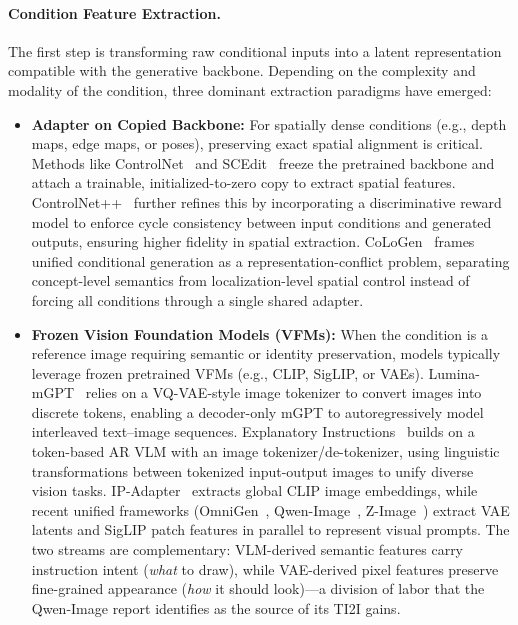 \paragraph{Condition Feature Extraction.}
The first step is transforming raw conditional inputs into a latent representation compatible with the generative backbone. Depending on the complexity and modality of the condition, three dominant extraction paradigms have emerged:
\begin{itemize}
    \item \textbf{Adapter on Copied Backbone:} For spatially dense conditions (e.g., depth maps, edge maps, or poses), preserving exact spatial alignment is critical. Methods like ControlNet~\citep{zhang2023controlnet} and SCEdit~\citep{jiang2024scedit} freeze the pretrained backbone and attach a trainable, initialized-to-zero copy to extract spatial features. ControlNet++~\citep{controlnet++} further refines this by incorporating a discriminative reward model to enforce cycle consistency between input conditions and generated outputs, ensuring higher fidelity in spatial extraction.
    CoLoGen~\citep{song2026cologen} frames unified conditional generation as a representation-conflict problem, separating concept-level semantics from localization-level spatial control instead of forcing all conditions through a single shared adapter.
    \item \textbf{Frozen Vision Foundation Models (VFMs):} When the condition is a reference image requiring semantic or identity preservation, models typically leverage frozen pretrained VFMs (e.g., CLIP, SigLIP, or VAEs). 
    Lumina-mGPT~\citep{liu2024luminamgpt} relies on a VQ-VAE-style image tokenizer to convert images into discrete tokens, enabling a decoder-only mGPT to autoregressively model interleaved text--image sequences.
    Explanatory Instructions~\citep{shen2024explanatory} builds on a token-based AR VLM with an image tokenizer/de-tokenizer, using linguistic transformations between tokenized input-output images to unify diverse vision tasks.
    IP-Adapter~\citep{ye2023ip} extracts global CLIP image embeddings, while recent unified frameworks (OmniGen~\citep{wu2025omnigen2}, Qwen-Image~\citep{wu2025qwen}, Z-Image~\citep{cai2025z}) extract VAE latents and SigLIP patch features in parallel to represent visual prompts. The two streams are complementary: VLM-derived semantic features carry instruction intent (\emph{what} to draw), while VAE-derived pixel features preserve fine-grained appearance (\emph{how} it should look)---a division of labor that the Qwen-Image report identifies as the source of its TI2I gains.

\end{itemize}
